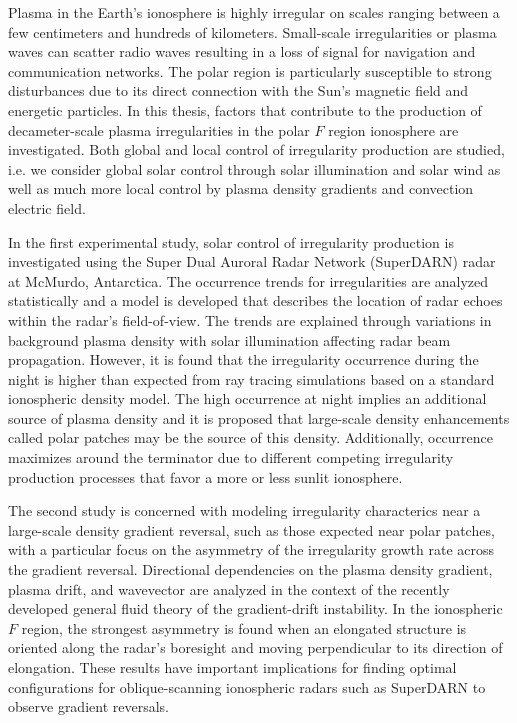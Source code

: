
Plasma in the Earth's ionosphere is highly irregular on scales ranging between a few centimeters and hundreds of kilometers.  Small-scale irregularities or plasma waves can scatter radio waves resulting in a loss of signal for navigation and communication networks.  The polar region is particularly susceptible to strong disturbances due to its direct connection with the Sun's magnetic field and energetic particles.  In this thesis, factors that contribute to the production of decameter-scale plasma irregularities in the polar \(F\) region ionosphere are investigated.  Both global and local control of irregularity production are studied, i.e. we consider global solar control through solar illumination and solar wind as well as much more local control by plasma density gradients and convection electric field.

In the first experimental study, solar control of irregularity production is investigated using the Super Dual Auroral Radar Network (SuperDARN) radar at McMurdo, Antarctica.  The occurrence trends for irregularities are analyzed statistically and a model is developed that describes the location of radar echoes within the radar's field-of-view.  The trends are explained through variations in background plasma density with solar illumination affecting radar beam propagation.  However, it is found that the irregularity occurrence during the night is higher than expected from ray tracing simulations based on a standard ionospheric density model.  The high occurrence at night implies an additional source of plasma density and it is proposed that large-scale density enhancements called polar patches may be the source of this density.  Additionally, occurrence maximizes around the terminator due to different competing irregularity production processes that favor a more or less sunlit ionosphere.

The second study is concerned with modeling irregularity characterics near a large-scale density gradient reversal, such as those expected near polar patches, with a particular focus on the asymmetry of the irregularity growth rate across the gradient reversal.  Directional dependencies on the plasma density gradient, plasma drift, and wavevector are analyzed in the context of the recently developed general fluid theory of the gradient-drift instability.  In the ionospheric \(F\) region, the strongest asymmetry is found when an elongated structure is oriented along the radar's boresight and moving perpendicular to its direction of elongation.  These results have important implications for finding optimal configurations for oblique-scanning ionospheric radars such as SuperDARN to observe gradient reversals.

